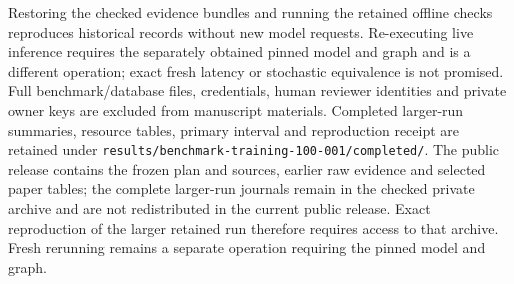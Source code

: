 \documentclass[10pt]{article}
\begin{document}
Restoring the checked evidence bundles and running the retained offline checks reproduces historical records without new model requests. Re-executing live inference requires the separately obtained pinned model and graph and is a different operation; exact fresh latency or stochastic equivalence is not promised. Full benchmark/database files, credentials, human reviewer identities and private owner keys are excluded from manuscript materials. Completed larger-run summaries, resource tables, primary interval and reproduction receipt are retained under \texttt{results/benchmark-training-100-001/completed/}. The public release contains the frozen plan and sources, earlier raw evidence and selected paper tables; the complete larger-run journals remain in the checked private archive and are not redistributed in the current public release. Exact reproduction of the larger retained run therefore requires access to that archive. Fresh rerunning remains a separate operation requiring the pinned model and graph.\par
\end{document}
